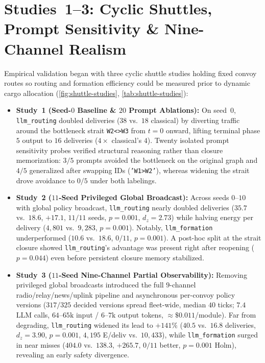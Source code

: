 \documentclass[11pt,a4paper,oneside]{report}
\begin{document}
\section[Studies 1--3: Cyclic Shuttles]{Studies~1--3: Cyclic Shuttles, Prompt Sensitivity \& Nine-Channel Realism}
Empirical validation began with three cyclic shuttle studies holding fixed convoy routes so routing and formation efficiency could be measured prior to dynamic cargo allocation (\autoref{fig:shuttle-studies}, \autoref{tab:shuttle-studies}):
\begin{itemize}
    \item \textbf{Study~1 (Seed-$0$ Baseline \& $20$ Prompt Ablations):} On seed~$0$, \texttt{llm\_routing} doubled deliveries ($38$ vs.\ $18$ classical) by diverting traffic around the bottleneck strait \texttt{W2<>W3} from $t=0$ onward, lifting terminal phase $5$ output to $16$ deliveries ($4\times$ classical's $4$). Twenty isolated prompt sensitivity probes verified structural reasoning rather than closure memorization: $3/5$ prompts avoided the bottleneck on the original graph and $4/5$ generalized after swapping IDs (\texttt{'W1>W2'}), whereas widening the strait drove avoidance to $0/5$ under both labelings.
    \item \textbf{Study~2 ($11$-Seed Privileged Global Broadcast):} Across seeds $0\text{--}10$ with global policy broadcast, \texttt{llm\_routing} nearly doubled deliveries ($35.7$ vs.\ $18.6$, $+17.1$, $11/11$ seeds, $p=0.001$, $d_z=2.73$) while halving energy per delivery ($4{,}801$ vs.\ $9{,}283$, $p=0.001$). Notably, \texttt{llm\_formation} underperformed ($10.6$ vs.\ $18.6$, $0/11$, $p=0.001$). A post-hoc split at the strait closure showed \texttt{llm\_routing}'s advantage was present right after reopening ($p=0.044$) even before persistent closure memory stabilized.
    \item \textbf{Study~3 ($11$-Seed Nine-Channel Partial Observability):} Removing privileged global broadcasts introduced the full $9$-channel radio/relay/news/uplink pipeline and asynchronous per-convoy policy versions ($317/325$ decided versions spread fleet-wide, median $40$ ticks; $7.4$ LLM calls, $64\text{--}65\text{k}$ input / $6\text{--}7\text{k}$ output tokens, $\approx \$0.011$/module). Far from degrading, \texttt{llm\_routing} widened its lead to $+141\%$ ($40.5$ vs.\ $16.8$ deliveries, $d_z=3.90$, $p=0.001$, $4{,}195$ E/deliv vs.\ $10{,}433$), while \texttt{llm\_formation} surged in near misses ($404.0$ vs.\ $138.3$, $+265.7$, $0/11$ better, $p=0.001$ Holm), revealing an early safety divergence.
\end{itemize}
\end{document}
